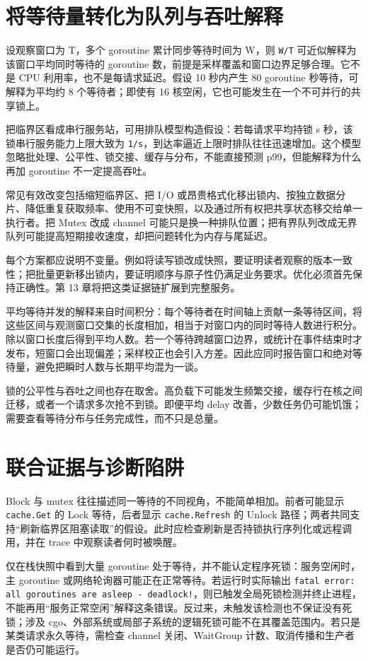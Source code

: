 \documentclass[UTF8,fontset=fandol,openany,11pt]{ctexbook}
\begin{document}
\section{将等待量转化为队列与吞吐解释}
设观察窗口为 T，多个 goroutine 累计同步等待时间为 W，则 \texttt{W/\allowbreak{}T} 可近似解释为该窗口平均同时等待的 goroutine 数，前提是采样覆盖和窗口边界足够合理。它不是 CPU 利用率，也不是每请求延迟。假设 10 秒内产生 80 goroutine 秒等待，可解释为平均约 8 个等待者；即使有 16 核空闲，它也可能发生在一个不可并行的共享锁上。

把临界区看成串行服务站，可用排队模型构造假设：若每请求平均持锁 s 秒，该锁串行服务能力上限大致为 \texttt{1/\allowbreak{}s}，到达率逼近上限时排队往往迅速增加。这个模型忽略批处理、公平性、锁交接、缓存与分布，不能直接预测 p99，但能解释为什么再加 goroutine 不一定提高吞吐。

常见有效改变包括缩短临界区、把 I/O 或昂贵格式化移出锁内、按独立数据分片、降低重复获取频率、使用不可变快照，以及通过所有权把共享状态移交给单一执行者。把 Mutex 改成 channel 可能只是换一种排队位置；把有界队列改成无界队列可能提高短期接收速度，却把问题转化为内存与尾延迟。

每个方案都应说明不变量。例如将读写锁改成快照，要证明读者观察的版本一致性；把批量更新移出锁内，要证明顺序与原子性仍满足业务要求。优化必须首先保持正确性。第 13 章将把这类证据链扩展到完整服务。

平均等待并发的解释来自时间积分：每个等待者在时间轴上贡献一条等待区间，将这些区间与观测窗口交集的长度相加，相当于对窗口内的同时等待人数进行积分。除以窗口长度后得到平均人数。若一个等待跨越窗口边界，或统计在事件结束时才发布，短窗口会出现偏差；采样校正也会引入方差。因此应同时报告窗口和绝对等待量，避免把瞬时人数与长期平均混为一谈。

锁的公平性与吞吐之间也存在取舍。高负载下可能发生频繁交接，缓存行在核之间迁移，或者一个请求多次抢不到锁。即便平均 delay 改善，少数任务仍可能饥饿；需要查看等待分布与任务完成性，而不只是总量。

\section{联合证据与诊断陷阱}
Block 与 mutex 往往描述同一等待的不同视角，不能简单相加。前者可能显示 \texttt{cache.\allowbreak{}Get} 的 Lock 等待，后者显示 \texttt{cache.\allowbreak{}Refresh} 的 Unlock 路径；两者共同支持“刷新临界区阻塞读取”的假设。此时应检查刷新是否持锁执行序列化或远程调用，并在 trace 中观察读者何时被唤醒。

仅在栈快照中看到大量 goroutine 处于等待，并不能认定程序死锁：服务空闲时，主 goroutine 或网络轮询器可能正在正常等待。若运行时实际输出 \texttt{fatal error:\allowbreak{} all goroutines are asleep -\allowbreak{} deadlock!}，则已触发全局死锁检测并终止进程，不能再用“服务正常空闲”解释这条错误。反过来，未触发该检测也不保证没有死锁；涉及 cgo、外部系统或局部子系统的逻辑死锁可能不在其覆盖范围内。若只是某类请求永久等待，需检查 channel 关闭、WaitGroup 计数、取消传播和生产者是否仍可能运行。
\end{document}
